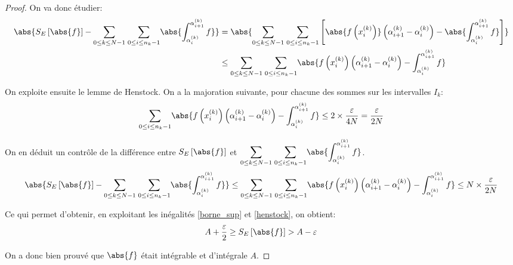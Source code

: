 \begin{proof}
On va donc étudier:
\begin{align*}
\abs{S_E\left [\abs{f}\right ] - \displaystyle{\sum \limits_{0 \leq k \leq N-1}} \; \displaystyle{\sum \limits_{0 \leq i \leq n_k-1}} \abs{\int_{\alpha_i^{(k)}}^{\alpha_{i+1}^{(k)}} f}} & = \abs{\displaystyle{\sum \limits_{0 \leq k \leq N-1}} \; \displaystyle{\sum \limits_{0 \leq i \leq n_k-1}}\left [\abs{f\left (x_i^{(k)}\right )}\left( \alpha_{i+1}^{(k)} - \alpha_i^{(k)}\right ) - \abs{\int_{\alpha_i^{(k)}}^{\alpha_{i+1}^{(k)}} f}\right ]} \\
 & \leq \displaystyle{\sum \limits_{0 \leq k \leq N-1}} \; \displaystyle{\sum \limits_{0 \leq i \leq n_k-1}} \abs{f\left (x_i^{(k)}\right )\left( \alpha_{i+1}^{(k)} - \alpha_i^{(k)}\right ) - \int_{\alpha_i^{(k)}}^{\alpha_{i+1}^{(k)}} f}
\end{align*}

On exploite ensuite le lemme de Henstock. On a la majoration suivante, pour chacune des sommes sur les intervalles $I_k$:
\[
\displaystyle{\sum \limits_{0 \leq i \leq n_k-1}} \abs{f\left (x_i^{(k)}\right )\left( \alpha_{i+1}^{(k)} - \alpha_i^{(k)}\right ) - \int_{\alpha_i^{(k)}}^{\alpha_{i+1}^{(k)}} f} \leq 2 \times \dfrac{\varepsilon}{4N} = \dfrac{\varepsilon}{2N}
\]

On en déduit un contrôle de la différence entre $S_E\left [\abs{f}\right ]$ et $\displaystyle{\sum \limits_{0 \leq k \leq N-1}} \; \displaystyle{\sum \limits_{0 \leq i \leq n_k-1}} \abs{\int_{\alpha_i^{(k)}}^{\alpha_{i+1}^{(k)}} f}$.
\begin{equation}
\label{henstock}
\abs{S_E\left [\abs{f}\right ] - \displaystyle{\sum \limits_{0 \leq k \leq N-1}} \; \displaystyle{\sum \limits_{0 \leq i \leq n_k-1}} \abs{\int_{\alpha_i^{(k)}}^{\alpha_{i+1}^{(k)}} f}} \leq \displaystyle{\sum \limits_{0 \leq k \leq N-1}} \; \displaystyle{\sum \limits_{0 \leq i \leq n_k-1}} \abs{f\left (x_i^{(k)}\right )\left( \alpha_{i+1}^{(k)} - \alpha_i^{(k)}\right ) - \int_{\alpha_i^{(k)}}^{\alpha_{i+1}^{(k)}} f} \leq N \times \dfrac{\varepsilon}{2N}
\end{equation}



Ce qui permet d'obtenir, en exploitant les inégalités \ref{borne_sup} et \ref{henstock}, on obtient:
\[
A + \dfrac{\varepsilon}{2} \geq S_E\left [\abs{f}\right ] > A-\varepsilon
\]

On a donc bien prouvé que $\abs{f}$  était intégrable et d'intégrale $A$.
\end{proof}


